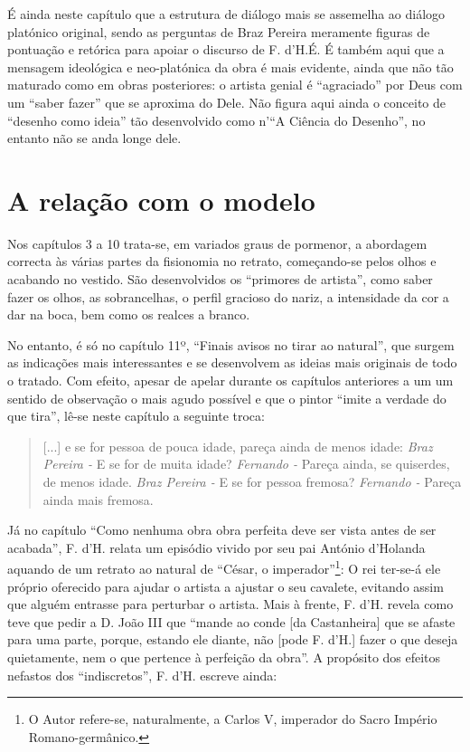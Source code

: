 \documentclass{article}
\begin{document}
É ainda neste capítulo que a estrutura de diálogo mais se assemelha ao
diálogo platónico original, sendo as perguntas de Braz Pereira
meramente figuras de pontuação e retórica para apoiar o discurso de
F. d'H.É. É também aqui que a mensagem ideológica e neo-platónica da
obra é mais evidente, ainda que não tão maturado como em obras
posteriores: o artista genial é ``agraciado'' por Deus com um ``saber
fazer'' que se aproxima do Dele\cite[p.14]{holanda}. Não figura aqui
ainda o conceito de ``desenho como ideia'' tão desenvolvido como n'``A
Ciência do Desenho''\cite{holanda-desenho}, no entanto não se anda
longe dele.

\section{A relação com o modelo}

Nos capítulos 3 a 10 trata-se, em variados graus de pormenor, a
abordagem correcta às várias partes da fisionomia no retrato,
começando-se pelos olhos e acabando no vestido. São desenvolvidos os
``primores de artista'', como saber fazer os olhos, as sobrancelhas, o
perfil gracioso do nariz, a intensidade da cor a dar na boca, bem como
os realces a branco.

No entanto, é só no capítulo 11º, ``Finais avisos no tirar ao
natural'', que surgem as indicações mais interessantes e se
desenvolvem as ideias mais originais de todo o tratado. Com efeito,
apesar de apelar durante os capítulos anteriores a um um sentido de
observação o mais agudo possível e que o pintor ``imite a verdade do
que tira''\cite[p.31]{holanda}, lê-se neste capítulo a seguinte
troca\cite[p.39]{holanda}:

\begin{quote}
  [...] e se for pessoa de pouca idade, pareça ainda de menos idade:
  \emph{Braz Pereira -}  E se for de muita idade?
  \emph{Fernando -}  Pareça ainda, se quiserdes, de menos idade.
  \emph{Braz Pereira -}  E se for pessoa fremosa?
  \emph{Fernando -}  Pareça ainda mais fremosa.
\end{quote}

Já no capítulo ``Como nenhuma obra obra perfeita deve ser vista antes
de ser acabada'', F. d'H. relata um episódio vivido por seu pai
António d'Holanda aquando de um retrato ao natural de ``César, o
imperador''\footnote{O Autor refere-se, naturalmente, a Carlos V,
  imperador do Sacro Império Romano-germânico.}\cite[p.17]{holanda}: O
rei ter-se-á ele próprio oferecido para ajudar o artista a ajustar o
seu cavalete, evitando assim que alguém entrasse para perturbar o
artista. Mais à frente, F. d'H. revela como teve que pedir a D. João
III que ``mande ao conde [da Castanheira] que se afaste para uma
parte, porque, estando ele diante, não [pode F. d'H.] fazer o que
deseja quietamente, nem o que pertence à perfeição da obra''. A
propósito dos efeitos nefastos dos ``indiscretos'', F. d'H. escreve
ainda\cite[p.18]{holanda}:
\end{document}
